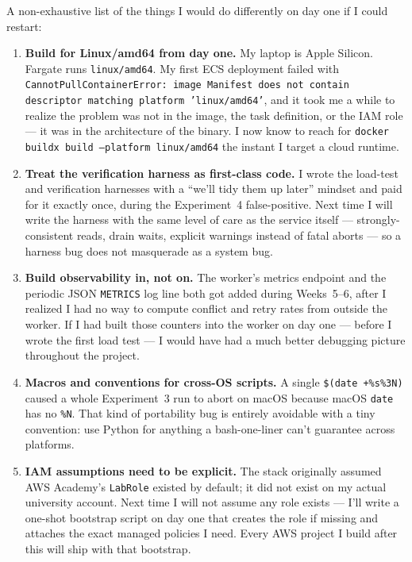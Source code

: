 \documentclass[11pt,a4paper]{article}
\begin{document}
\begin{lessonbox}
A non-exhaustive list of the things I would do differently on day one if I could restart:

\begin{enumerate}[leftmargin=*, itemsep=0.2em]
    \item \textbf{Build for Linux/amd64 from day one.} My laptop is Apple Silicon. Fargate runs \texttt{linux/amd64}. My first ECS deployment failed with \texttt{CannotPullContainerError: image Manifest does not contain descriptor matching platform 'linux/amd64'}, and it took me a while to realize the problem was not in the image, the task definition, or the IAM role --- it was in the architecture of the binary. I now know to reach for \texttt{docker buildx build --platform linux/amd64} the instant I target a cloud runtime.

    \item \textbf{Treat the verification harness as first-class code.} I wrote the load-test and verification harnesses with a ``we'll tidy them up later'' mindset and paid for it exactly once, during the Experiment~4 false-positive. Next time I will write the harness with the same level of care as the service itself --- strongly-consistent reads, drain waits, explicit warnings instead of fatal aborts --- so a harness bug does not masquerade as a system bug.

    \item \textbf{Build observability in, not on.} The worker's metrics endpoint and the periodic JSON \texttt{METRICS} log line both got added during Weeks~5--6, after I realized I had no way to compute conflict and retry rates from outside the worker. If I had built those counters into the worker on day one --- before I wrote the first load test --- I would have had a much better debugging picture throughout the project.

    \item \textbf{Macros and conventions for cross-OS scripts.} A single \texttt{\$(date +\%s\%3N)} caused a whole Experiment~3 run to abort on macOS because macOS \texttt{date} has no \texttt{\%N}. That kind of portability bug is entirely avoidable with a tiny convention: use Python for anything a bash-one-liner can't guarantee across platforms.

    \item \textbf{IAM assumptions need to be explicit.} The stack originally assumed AWS Academy's \texttt{LabRole} existed by default; it did not exist on my actual university account. Next time I will not assume any role exists --- I'll write a one-shot bootstrap script on day one that creates the role if missing and attaches the exact managed policies I need. Every AWS project I build after this will ship with that bootstrap.
\end{enumerate}
\end{lessonbox}
\end{document}
